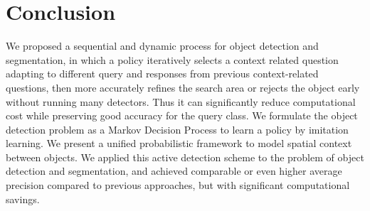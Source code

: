 \section{Conclusion}
We proposed a sequential and dynamic process for object detection and segmentation, in which a policy iteratively selects a context related question adapting to different query and responses from previous context-related questions, then more accurately refines the search area or rejects the object early without running many detectors. Thus it can significantly reduce computational cost while preserving good accuracy for the query class. We formulate the object detection problem as a Markov Decision Process to learn a policy by imitation learning. We present a unified probabilistic framework to model spatial context between objects. We applied this active detection scheme to the problem of object detection and segmentation, and achieved comparable or even higher average precision compared to previous approaches, but with significant computational savings. 